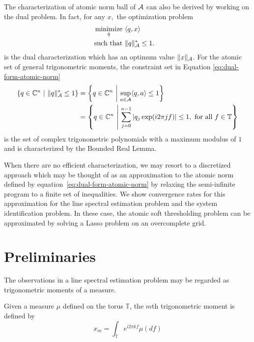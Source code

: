 The characterization of atomic norm ball of $\mathcal{A}$ can also be derived by working on the dual problem. In fact, for any $x,$ the optimization problem
\begin{equation}
	\label{eq:dual-form-atomic-norm}
	\begin{aligned}
		\mathop{\operatorname{minimize}}_q~ & \langle q, x\rangle &&\\
		\text{such that } & \lVert q\rVert_{\mathcal{A}}^*	 \leq 1.	&&
	\end{aligned}
\end{equation}
is the dual characterization which has an optimum value $\lVert x\rVert_{\mathcal{A}}$. For the atomic set of general trigonometric moments, the constraint set in Equation \eqref{eq:dual-form-atomic-norm}
\begin{align}
	\left\{ q \in \mathbb{C}^n ~\middle|~ \lVert q\rVert_{\mathcal{A}}^* \leq 1 \right\} &
	= \left\{ q \in \mathbb{C}^n ~\middle|~ \sup_{a \in \mathcal{A}}\langle q, a\rangle \leq 1 \right\} \\
	&= \left\{ q \in \mathbb{C}^n ~\middle|~ \sum_{j=0}^{n-1}{|q_j \exp(i 2\pi j f)|} \leq 1, \text{ for all } f \in \mathbb{T} \right\}
\end{align}
is the set of complex trigonometric polynomials with a maximum modulus of $1$
and is characterized by the Bounded Real Lemma. 

When there are no efficient characterization, we may resort to a discretized
approach which may be thought of as an approximation to the atomic norm defined
by equation~\eqref{eq:dual-form-atomic-norm} by relaxing the semi-infinite
program to a finite set of inequalities. We show convergence rates for this
approximation for the line spectral estimation problem and the system
identification problem. In these case, the atomic soft thresholding problem can
be approximated by solving a Lasso problem on an overcomplete grid.


\section{Preliminaries} %
\label{sec:preliminaries}

The observations in a line spectral estimation problem may be regarded as
trigonometric moments of a measure. 

\begin{definition}
Given a measure $\mu$ defined on the torus $\mathbb{T}$, the $m$th
trigonometric moment is defined by
\begin{equation}
	\label{eq:trig-moment-measure}
	x_m = \int_\mathbb{T} e^{i 2 \pi k f} \mu ( d f)
\end{equation}
\end{definition}

